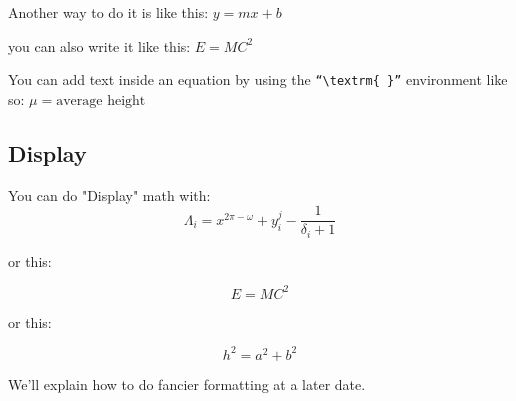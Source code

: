 \documentclass[]{article}
\begin{document}
Another way to do it is like this: $ y = mx + b$

you can also write it like this:
\begin{math}
    E = MC^2
\end{math}

You can add text inside an equation by using the \texttt{``\textbackslash textrm\{ \}''} 
environment like so:
\begin{math}
        \mu = \textrm{average height} 
\end{math}

\subsection{Display}

You can do "Display" math with:
\[ \Lambda_{i} = x^{2\pi-\omega} + y^{j}_{i} - \frac{1}{\delta_i + 1} \]

or this:

\begin{equation}
    E = MC^2
\end{equation}

or this:

\begin{displaymath}
    h^2 = a^2 + b^2
\end{displaymath}

We'll explain how to do fancier formatting at a later date.
\end{document}
